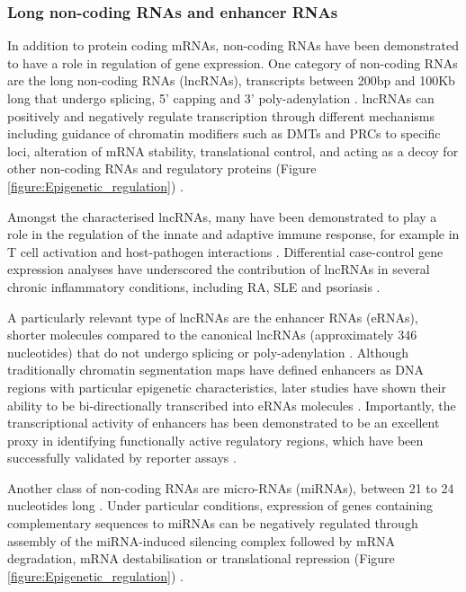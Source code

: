 \subsubsection{Long non-coding RNAs and enhancer RNAs}
In addition to protein coding mRNAs, non-coding RNAs have been demonstrated to have a role in regulation of gene expression. One category of non-coding RNAs are the long non-coding RNAs (lncRNAs), transcripts between 200bp and 100Kb long that undergo splicing, 5' capping and 3' poly-adenylation \parencite{Derrien2012}. lncRNAs can positively and negatively regulate transcription through different mechanisms including guidance of chromatin modifiers such as DMTs and PRCs to specific loci, alteration of mRNA stability, translational control, and acting as a decoy for other non-coding RNAs and regulatory proteins (Figure \ref{figure:Epigenetic_regulation}) \parencite{Pandey2008,Faghihi2008,Gong2011,Carrieri2012, Kino2010}.  %

Amongst the characterised lncRNAs, many have been demonstrated to play a role in the regulation of the innate and adaptive immune response, for example in T cell activation and host-pathogen interactions \parencite{Pang2009, Rossetto2012}. Differential case-control gene expression analyses have underscored the contribution of lncRNAs in several chronic inflammatory conditions, including RA, SLE and psoriasis \parencite{Mueller2014,Shi2014,Li2014,Ahn2016}.

A particularly relevant type of lncRNAs are the enhancer RNAs (eRNAs), shorter molecules compared to the canonical lncRNAs (approximately 346 nucleotides) that do not undergo splicing or poly-adenylation \parencite{FANTOM2014}. Although traditionally chromatin segmentation maps have defined enhancers as DNA regions with particular epigenetic characteristics, later studies have shown their ability to be bi-directionally transcribed into eRNAs molecules \parencite{DeSanta2010, Kim2010}. Importantly, the transcriptional activity of enhancers has been demonstrated to be an excellent proxy in identifying functionally active regulatory regions, which have been successfully validated by reporter assays \parencite{FANTOM2014, Andersen2014}. 

Another class of non-coding RNAs are micro-RNAs (miRNAs), between 21 to 24 nucleotides long \parencite{Lee2002}. Under particular conditions, expression of genes containing complementary sequences to miRNAs can be negatively regulated through assembly of the miRNA-induced silencing complex followed by mRNA degradation, mRNA destabilisation or translational repression (Figure \ref{figure:Epigenetic_regulation}) \parencite{Ameres2010,Braun2011,Petersen2006,Lewis2005, Friedman2008}. 

